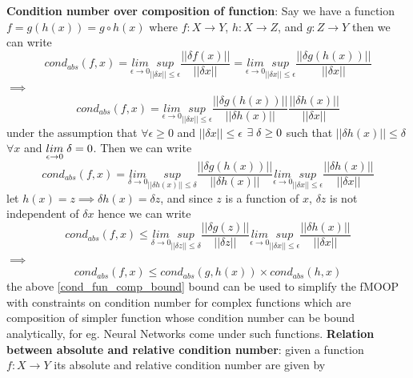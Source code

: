 \textbf{Condition number over composition of function}: Say we have a function $f=g(h(x)) = g \circ h(x)$ where $f:X\to Y$, $h:X\to Z$, and $g:Z\to Y$ then we can write
\begin{equation}
    cond_{abs}(f,x) = \underset{\epsilon \to 0}{lim}\underset{||\delta x||\le \epsilon}{sup} \frac{||\delta f(x)||}{||\delta x||} = \underset{\epsilon \to 0}{lim}\underset{||\delta x||\le \epsilon}{sup} \frac{||\delta g(h(x))||}{||\delta x||}
\end{equation}
$\implies$
\begin{equation}
    cond_{abs}(f,x) = \underset{\epsilon \to 0}{lim}\underset{||\delta x||\le \epsilon}{sup} \frac{||\delta g(h(x))||}{||\delta h(x)||}\frac{||\delta h(x)||}{||\delta x||}
\end{equation}
under the assumption that $\forall \epsilon \ge 0$ and $||\delta x||
\le \epsilon$ $\exists\hspace{1mm} \delta \ge 0$ such that $||\delta h(x)|| \le \delta$ $\forall x$ and $\underset{\epsilon \to 0}{lim}\hspace{1mm} \delta = 0$. Then we can write
\begin{equation}
    cond_{abs}(f,x) = \underset{\delta \to 0}{lim}\underset{||\delta h(x)||\le \delta}{sup} \frac{||\delta g(h(x))||}{||\delta h(x)||} \underset{\epsilon \to 0}{lim}\underset{||\delta x||\le \epsilon}{sup} \frac{||\delta h(x)||}{||\delta x||}
\end{equation}
let $h(x) = z \implies \delta h(x) = \delta z $, and since $z$ is a function of $x$, $\delta z$ is not independent of $\delta x$ hence we can write
\begin{equation}
    cond_{abs}(f,x) \le \underset{\delta \to 0}{lim}\underset{||\delta z||\le \delta}{sup} \frac{||\delta g(z)||}{||\delta z||} \underset{\epsilon \to 0}{lim}\underset{||\delta x||\le \epsilon}{sup} \frac{||\delta h(x)||}{||\delta x||}
\end{equation}
$\implies$
\begin{equation} \label{cond_fun_comp_bound}
    cond_{abs}(f,x) \le cond_{abs}(g,h(x))\times cond_{abs}(h,x)
\end{equation}
the above \ref{cond_fun_comp_bound} bound can be used to simplify the fMOOP with constraints on condition number for complex functions which are composition of simpler function whose condition number can be bound analytically, for eg. Neural Networks come under such functions.
\newline\newline \textbf{Relation between absolute and relative condition number}: given a function $f:X\to Y$ its absolute and relative condition number are given by
